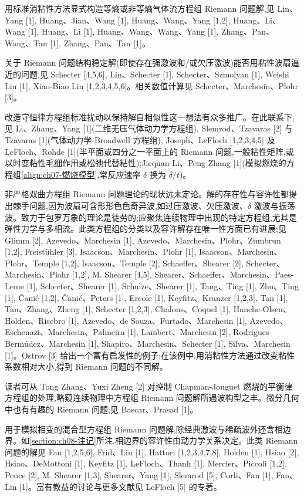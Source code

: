 \documentclass[../../main.tex]{subfiles}
\begin{document}
用标准消粘性方法显式构造等熵或非等熵气体流方程组 Riemann 问题解,见 Lin、Yang [1], Huang、Jian、Wang [1], Huang、Wang、Yang [1,2], Huang、Li、Wang [1], Huang、Li [1], Huang、Wang、Wang、Yang [1], Zhang、Pan、Wang、Tan [1], Zhang、Pan、Tan [1]。

关于 Riemann 问题结构稳定解(即使存在强激波和/或欠压激波)能否用粘性波扇逼近的问题,见 Schecter [4,5,6], Lin、Schecter [1], Schecter、Szmolyan [1], Weishi Liu [1], Xiao-Biao Lin [1,2,3,4,5,6]。相关数值计算见 Schecter、Marchesin、Plohr [3]。

改造守恒律方程组标准扰动以保持解自相似性这一想法有众多推广。在此联系下,见 Li、Zhang、Yang [1](二维无压气体动力学方程组), Slemrod、Tzavaras [2] 与 Tzavaras [1](气体动力学 Broadwell 方程组), Joseph、LeFloch [1,2,3,4,5] 及 LeFloch、Rohde [1](半平面或四分之一平面上的 Riemann 问题,一般粘性矩阵,或以时变粘性毛细作用或松弛代替粘性);Jiequan Li、Peng Zhang [1](模拟燃烧的方程组\eqref{align:ch07-燃烧模型},常反应速率 $\delta$ 换为 $\delta/t$)。

非严格双曲方程组 Riemann 问题理论的现状远未定论。解的存在性与容许性都提出棘手问题,因为波扇可含形形色色奇异波,如过压激波、欠压激波、$\delta$ 激波与振荡波。致力于包罗万象的理论是徒劳的;应聚焦连续物理中出现的特定方程组,尤其是弹性力学与多相流。此类方程组的分类以及容许解存在唯一性方面已有进展;见 Glimm [2], Azevedo、Marchesin [1], Azevedo、Marchesin、Plohr、Zumbrun [1,2], Freistühler [3], Isaacson、Marchesin、Plohr [1], Isaacson、Marchesin、Plohr、Temple [1,2], Isaacson、Temple [2], Schaeffer、Shearer [2], Schecter、Marchesin、Plohr [1,2], M. Shearer [4,5], Shearer、Schaeffer、Marchesin、Paes-Leme [1], Schecter、Shearer [1], Schulze、Shearer [1], Tang、Ting [1], Zhu、Ting [1], Čanić [1,2], Čanić、Peters [1], Ercole [1], Keyfitz、Kranzer [1,2,3], Tan [1], Tan、Zhang、Zheng [1], Schecter [1,2,3], Chalons、Coquel [1], Hanche-Olsen、Holden、Risebro [1], Azevedo、de Souza、Furtado、Marchesin [1], Azevedo、Eschenazi、Marchesin、Palmeira [1], Lambert、Marchesin [2], Rodrigues-Bermúdez、Marchesin [1], Shapiro、Marchesin、Schecter [1], Silva、Marchesin [1]。Ostrov [3] 给出一个富有启发性的例子:在该例中,用消粘性方法通过改变粘性系数相对大小,得到 Riemann 问题的不同解。

读者可从 Tong Zhang、Yuxi Zheng [2] 对控制 Chapman-Jouguet 燃烧的平衡律方程组的处理,略窥连续物理中方程组 Riemann 问题解所遇波构型之丰。微分几何中也有有趣的 Riemann 问题;见 Bascar、Prasad [1]。

用于模拟相变的混合型方程组 Riemann 问题解,除经典激波与稀疏波外还含相边界。如\cref{section:ch08-注记}所注,相边界的容许性由动力学关系决定。此类 Riemann 问题的解见 Fan [1,2,5,6], Frid、Liu [1], Hattori [1,2,3,4,7,8], Holden [1], Hsiao [2], Hsiao、DeMottoni [1], Keyfitz [1], LeFloch、Thanh [1], Mercier、Piccoli [1,2], Pence [2], M. Shearer [1,3], Shearer、Yang [1], Slemrod [5], Corli、Fan [1], Fan、Lin [1]。富有教益的讨论与更多文献见 LeFloch [5] 的专著。
\end{document}
